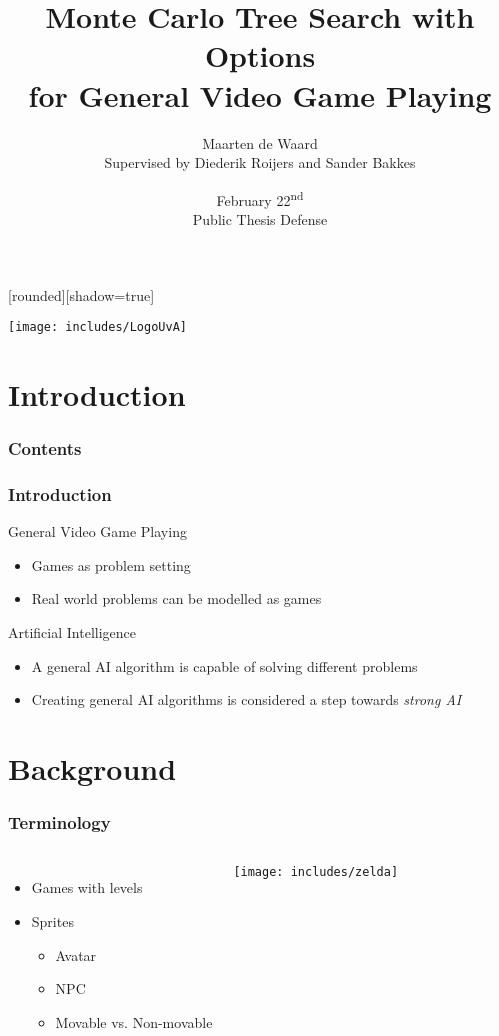 \documentclass{beamer}
\author[Maarten de Waard]{Maarten de Waard\\\small{Supervised by Diederik
	Roijers and Sander Bakkes}}
\title[O-MCTS for GVGP]{Monte Carlo Tree Search with Options\\for General Video Game Playing}
\date{February 22\textsuperscript{nd}\\Public Thesis Defense}
\begin{document}
[rounded][shadow=true]
\begin{frame}
	\vspace{-4.7em}
	\centerline{
	\texttt{[image: includes/LogoUvA]}
	}
	\maketitle
\end{frame}

\section{Introduction}

\begin{frame}
	\frametitle{Contents}
	\tableofcontents
\end{frame}

\begin{frame}
	\frametitle{Introduction}
	\begin{block}{General Video Game Playing}
		\begin{itemize}
			\item Games as problem setting
			\item Real world problems can be modelled as games
		\end{itemize}
	\end{block}
	\begin{block}{Artificial Intelligence}
		\begin{itemize}
			\item A general AI algorithm is capable of solving different problems
			\item Creating general AI algorithms is considered a step towards \emph{strong AI}
		\end{itemize}
	\end{block}
\end{frame}

\section{Background}

\begin{frame}
	\frametitle{Terminology}
	\begin{columns}
			\begin{itemize}
				\item Games with levels
				\item Sprites
				\begin{itemize}
					\item Avatar
					\item NPC
					\item Movable vs. Non-movable
				\end{itemize}
			\end{itemize}
			\texttt{[image: includes/zelda]}
	\end{columns}
\end{frame}
\end{document}
